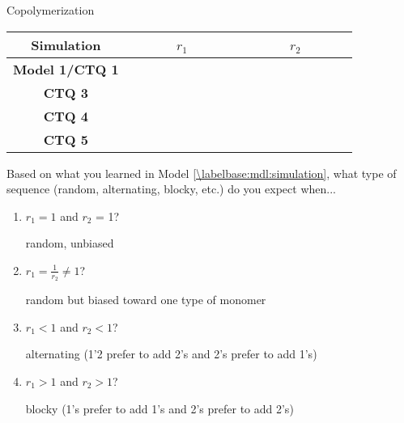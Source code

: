 \begin{activity}{Copolymerization}
\begin{ctqs}
		\begin{center}
		\renewcommand{\arraystretch}{2.5}
		\begin{tabular}{|c|c|c|}
			\hline
			\textbf{Simulation} & ~~~~~~$r_1$~~~~~~ & ~~~~~~$r_2$~~~~~~ \\\hline
			\textbf{Model 1/CTQ 1} & \answer{$\frac{0.5}{0.5}=1$} & \answer{$\frac{0.5}{0.5}=1$} \\\hline
			\textbf{CTQ 3} & \answer{$\frac{0.2}{0.8}=0.25$} & \answer{$\frac{0.2}{0.8}=0.25$} \\\hline
			\textbf{CTQ 4} & \answer{$\frac{0.8}{0.2}=4$} & \answer{$\frac{0.8}{0.2}=4$} \\\hline
			\textbf{CTQ 5} & \answer{$\frac{0.2}{0.8}=0.25$} & \answer{$\frac{0.8}{0.2}=4$} \\\hline
		\end{tabular}
		\end{center}

	\question Based on what you learned in Model \ref{\labelbase:mdl:simulation}, what type of sequence (random, alternating, blocky, etc.) do you expect when...
	
		\begin{enumerate}
			\item $r_1 = 1$ and $r_2$ = 1?
			
				\begin{solution}[0.5in]
					random, unbiased
				\end{solution}
			
			\item $r_1 = \frac{1}{r_2} \neq 1$?
			
				\begin{solution}[0.5in]
					random but biased toward one type of monomer
				\end{solution}
			
			\item $r_1 < 1$ and $r_2 < 1$?
			
				\begin{solution}[0.5in]
					alternating (1'2 prefer to add 2's and 2's prefer to add 1's)
				\end{solution}
			
			\item $r_1 > 1$ and $r_2 > 1$?
			
				\begin{solution}[0.5in]
					blocky (1's prefer to add 1's and 2's prefer to add 2's)
				\end{solution}
		\end{enumerate}


\end{ctqs}
\end{activity}
